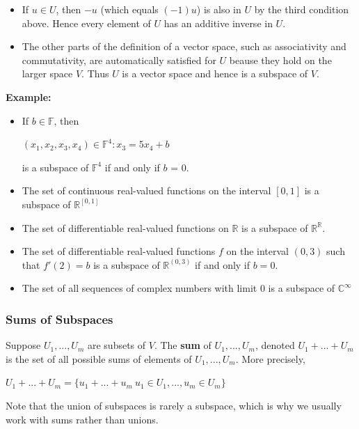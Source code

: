 \documentclass{report}
\begin{document}
\begin{itemize}
    \item If $u \in U$, then $-u$ (which equals $(-1)u$) is also in $U$ by the third condition above. Hence every element of $U$ has an additive inverse in $U$.
    \item The other parts of the definition of a vector space, such as associativity and commutativity, are automatically satisfied for $U$ beause they hold on the larger space $V$. Thus $U$ is a vector space and hence is a subspace of $V$.
\end{itemize}

\noindent \textbf{Example:}
\begin{itemize}
    \item If $b \in \mathbb{F}$, then \newline
        	    \centerline{${(x_1,x_2,x_3,x_4) \in \mathbb{F}^4:x_3=5x_4+b}$}\newline
    	     is a subspace of $\mathbb{F}^4$ if and only if $b$ = 0.
    \item The set of continuous real-valued functions on the interval $[0,1]$ is a subspace of $\mathbb{R}^{[0,1]}$
    \item The set of differentiable real-valued functions on $\mathbb{R}$ is a subspace of $\mathbb{R}^{\mathbb{R}}$.
    \item The set of differentiable real-valued functions $f$ on the interval $(0,3)$ such that $f'(2)=b$ is a subspace of $\mathbb{R}^{(0,3)}$ if and only if $b=0$.
    \item The set of all sequences of complex numbers with limit $0$ is a subspace of $\mathbb{C}^{\infty}$
    	    
\end{itemize}

\subsubsection{Sums of Subspaces}
\noindent
Suppose $U_1, ..., U_m$ are subsets of $V$. The \textbf{sum} of $U_1, ..., U_m$, denoted $U_1 + ... + U_m$ is the set of all possible sums of elements of $U_1, ..., U_m$. More precisely,\newline
\centerline{$U_1+...+U_m=\{u_1+...+u_m\:u_1 \in U_1, ..., u_m \in U_m\}$}\newline

Note that the union of subspaces is rarely a subspace, which is why we usually work with sums rather than unions.
\end{document}
